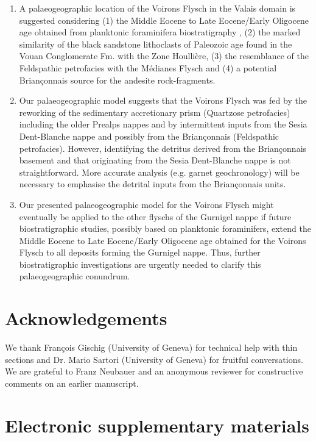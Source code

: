 \documentclass[twoside]{article}
\begin{document}
\begin{enumerate}
		\item A palaeogeographic location of the Voirons Flysch in the Valais domain is suggested considering (1) the Middle Eocene to Late Eocene/Early Oligocene age obtained from planktonic foraminifera biostratigraphy \citep{Ujetz1996,Ospina-Ostios2013}, (2) the marked similarity of the black sandstone lithoclasts of Paleozoic age found in the Vouan Conglomerate Fm. with the Zone Houllière, (3) the resemblance of the Feldspathic petrofacies with the Médianes Flysch and (4) a potential Briançonnais source for the andesite rock-fragments.
		\item Our palaeogeographic model suggests that the Voirons Flysch was fed by the reworking of the sedimentary accretionary prism (Quartzose petrofacies) including the older Prealps nappes and by intermittent inputs from the Sesia Dent-Blanche nappe and possibly from the Briançonnais (Feldspathic petrofacies). However, identifying the detritus derived from the Briançonnais basement and that originating from the Sesia Dent-Blanche nappe is not straightforward. More accurate analysis (e.g. garnet geochronology) will be necessary to emphasise the detrital inputs from the Briançonnais units.
		\item Our presented palaeogeographic model for the Voirons Flysch might eventually be applied to the other flyschs of the Gurnigel nappe if future biostratigraphic studies, possibly based on planktonic foraminifers, extend the Middle Eocene to Late Eocene/Early Oligocene age obtained for the Voirons Flysch to all deposits forming the Gurnigel nappe. Thus, further biostratigraphic investigations are urgently needed to clarify this palaeogeographic conundrum.
	\end{enumerate}

\section*{Acknowledgements}

We thank François Gischig (University of Geneva) for technical help with thin sections and Dr. Mario Sartori (University of Geneva) for fruitful conversations. We are grateful to Franz Neubauer and an anonymous reviewer for constructive comments on an earlier manuscript.\par

\section*{Electronic supplementary materials}
\end{document}
